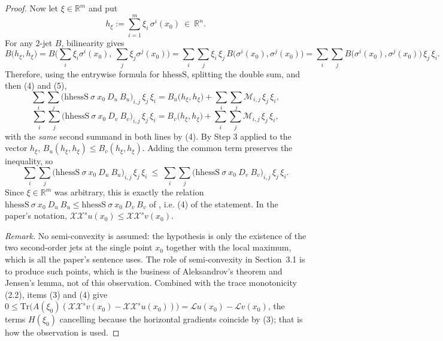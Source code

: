 \begin{proof}
Now let $\xi\in\mathbb R^{m}$ and put
\[
 h_\xi:=\sum_{i=1}^{m}\xi_i\,\sigma^{i}(x_0)\ \in\ \mathbb R^{n}.
\]
For any $2$-jet $B$, bilinearity gives
\[
 B\big(h_\xi,h_\xi\big)
  =B\Big(\sum_i\xi_i\sigma^{i}(x_0),\ \sum_j\xi_j\sigma^{j}(x_0)\Big)
  =\sum_{i}\sum_{j}\xi_i\,\xi_j\,B\big(\sigma^{i}(x_0),\sigma^{j}(x_0)\big)
  =\sum_{i}\sum_{j}B\big(\sigma^{i}(x_0),\sigma^{j}(x_0)\big)\,\xi_j\,\xi_i . \tag{5}
\]
Therefore, using the entrywise formula for $\mathrm{hhessS}$, splitting the double sum, and
then (4) and (5),
\[
 \sum_{i}\sum_{j}\big(\mathrm{hhessS}\ \sigma\ x_0\ D_u\ B_u\big)_{i,j}\,\xi_j\,\xi_i
  =B_u\big(h_\xi,h_\xi\big)+\sum_{i}\sum_{j}\mathcal M_{i,j}\,\xi_j\,\xi_i ,
\]
\[
 \sum_{i}\sum_{j}\big(\mathrm{hhessS}\ \sigma\ x_0\ D_v\ B_v\big)_{i,j}\,\xi_j\,\xi_i
  =B_v\big(h_\xi,h_\xi\big)+\sum_{i}\sum_{j}\mathcal M_{i,j}\,\xi_j\,\xi_i ,
\]
with the \emph{same} second summand in both lines by (4). By Step 3 applied to the vector
$h_\xi$, $B_u(h_\xi,h_\xi)\le B_v(h_\xi,h_\xi)$. Adding the common term preserves the
inequality, so
\[
 \sum_{i}\sum_{j}\big(\mathrm{hhessS}\ \sigma\ x_0\ D_u\ B_u\big)_{i,j}\,\xi_j\,\xi_i
 \ \le\
 \sum_{i}\sum_{j}\big(\mathrm{hhessS}\ \sigma\ x_0\ D_v\ B_v\big)_{i,j}\,\xi_j\,\xi_i .
\]
Since $\xi\in\mathbb R^{m}$ was arbitrary, this is exactly the relation
$\mathrm{hhessS}\ \sigma\ x_0\ D_u\ B_u\le\mathrm{hhessS}\ \sigma\ x_0\ D_v\ B_v$ of
\noderef{MatLe}, i.e. (4) of the statement. In the paper's notation,
$\mathcal X\mathcal X^{s}u(x_0)\le\mathcal X\mathcal X^{s}v(x_0)$.

\medskip\noindent\emph{Remark.} No semi-convexity is assumed: the hypothesis is only the
existence of the two second-order jets at the single point $x_0$ together with the local
maximum, which is all the paper's sentence uses. The role of semi-convexity in
Section~3.1 is to produce such points, which is the business of
Aleksandrov's theorem and Jensen's lemma, not of this observation. Combined with the trace
monotonicity (2.2), items (3) and (4) give
$0\le\mathrm{Tr}\big(A(\xi_0)(\mathcal X\mathcal X^{s}v(x_0)-\mathcal X\mathcal X^{s}u(x_0))\big)
=\mathcal Lu(x_0)-\mathcal Lv(x_0)$, the terms $H(\xi_0)$ cancelling because the horizontal
gradients coincide by (3); that is how the observation is used.
\end{proof}
